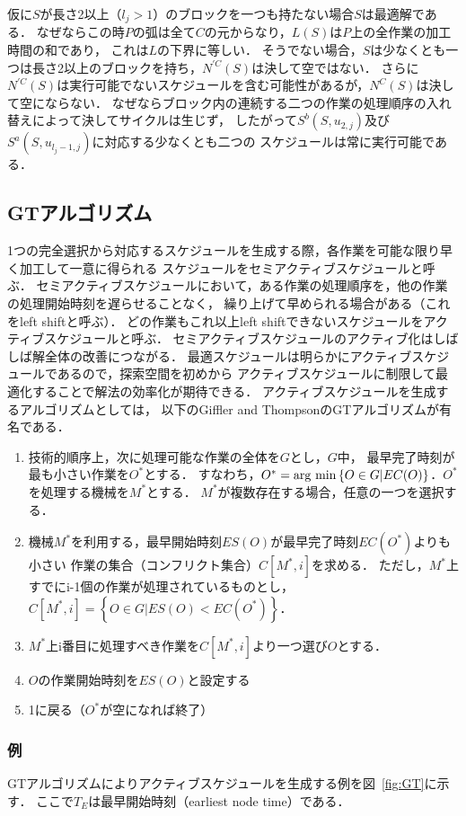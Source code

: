 \documentclass{jsarticle}
\newcommand{\argmin}{\mathop{\rm arg~min}\limits}
\begin{document}
仮に$S$が長さ2以上（$l_j>1$）のブロックを一つも持たない場合$S$は最適解である．
なぜならこの時$P$の弧は全て$C$の元からなり，$L(S)$は$P$上の全作業の加工時間の和であり，
これは$L$の下界に等しい．
そうでない場合，$S$は少なくとも一つは長さ2以上のブロックを持ち，$N^{'C}(S)$は決して空ではない．
さらに$N^{'C}(S)$は実行可能でないスケジュールを含む可能性があるが，$N^C(S)$は決して空にならない．
なぜならブロック内の連続する二つの作業の処理順序の入れ替えによって決してサイクルは生じず，
したがって$S^b(S,u_{2,j})$及び$S^a(S,u_{l_j-1,j})$に対応する少なくとも二つの
スケジュールは常に実行可能である．

\subsection{GTアルゴリズム}
1つの完全選択から対応するスケジュールを生成する際，各作業を可能な限り早く加工して一意に得られる
スケジュールをセミアクティブスケジュールと呼ぶ．
セミアクティブスケジュールにおいて，ある作業の処理順序を，他の作業の処理開始時刻を遅らせることなく，
繰り上げて早められる場合がある（これをleft shiftと呼ぶ）．
どの作業もこれ以上left shiftできないスケジュールをアクティブスケジュールと呼ぶ．
セミアクティブスケジュールのアクティブ化はしばしば解全体の改善につながる．
最適スケジュールは明らかにアクティブスケジュールであるので，探索空間を初めから
アクティブスケジュールに制限して最適化することで解法の効率化が期待できる．
アクティブスケジュールを生成するアルゴリズムとしては，
以下のGiffler and ThompsonのGTアルゴリズムが有名である．
\begin{enumerate}
	\item 技術的順序上，次に処理可能な作業の全体を$G$とし，$G$中，
		最早完了時刻が最も小さい作業を$O^*$とする．
		すなわち，$O^*=\argmin \left\{O\in G|EC(O) \right\}$．$O^*$を処理する機械を$M^*$とする．
		$M^*$が複数存在する場合，任意の一つを選択する．
	\item 機械$M^*$を利用する，最早開始時刻$ES(O)$が最早完了時刻$EC(O^*)$よりも小さい
		作業の集合（コンフリクト集合）$C[M^*,i]$を求める．
		ただし，$M^*$上すでにi-1個の作業が処理されているものとし，
		$C[M^*,i]= \left\{O\in G|ES(O)<EC(O^*) \right\}$．
	\item $M^*$上i番目に処理すべき作業を$C[M^*,i]$より一つ選び$O$とする．
	\item $O$の作業開始時刻を$ES(O)$と設定する
	\item 1に戻る（$O^*$が空になれば終了）
\end{enumerate}

\subsubsection{例}
GTアルゴリズムによりアクティブスケジュールを生成する例を図~\ref{fig:GT}に示す．
ここで$T_E$は最早開始時刻（earliest node time）である．
\end{document}
